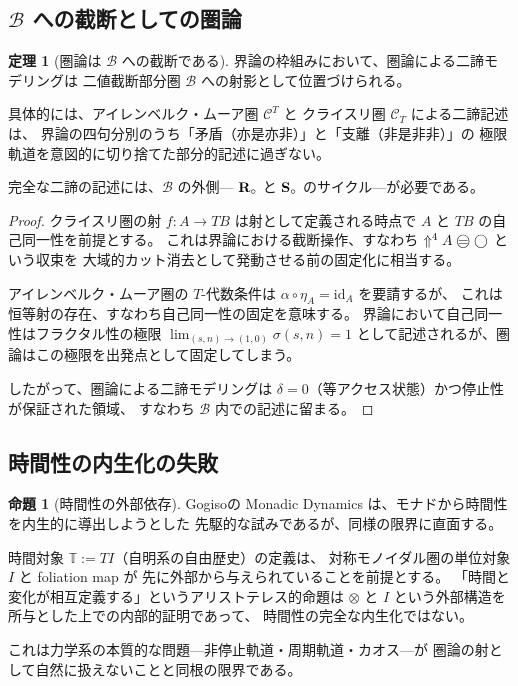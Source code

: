\documentclass[11pt,a4paper]{ltjsarticle}
\theoremstyle{definition}
\newtheorem{theorem}{定理}[section]
\newtheorem{proposition}{命題}[section]
\begin{document}
\subsection{$\mathcal{B}$ への截断としての圏論}

\begin{theorem}[圏論は $\mathcal{B}$ への截断である]
界論の枠組みにおいて、圏論による二諦モデリングは
二値截断部分圏 $\mathcal{B}$ への射影として位置づけられる。

具体的には、アイレンベルク・ムーア圏 $\mathcal{C}^T$ と
クライスリ圏 $\mathcal{C}_T$ による二諦記述は、
界論の四句分別のうち「矛盾（亦是亦非）」と「支離（非是非非）」の
極限軌道を意図的に切り捨てた部分的記述に過ぎない。

完全な二諦の記述には、$\mathcal{B}$ の外側---
$\mathbf{R}_{\circ}$ と $\mathbf{S}_{\circ}$ のサイクル---が必要である。
\end{theorem}

\begin{proof}
クライスリ圏の射 $f: A \to TB$ は射として定義される時点で
$A$ と $TB$ の自己同一性を前提とする。
これは界論における截断操作、すなわち
$\metanegation^4 A \mweq \dfix$ という収束を
大域的カット消去として発動させる前の固定化に相当する。

アイレンベルク・ムーア圏の $T$-代数条件は
$\alpha \circ \eta_A = \mathrm{id}_A$ を要請するが、
これは恒等射の存在、すなわち自己同一性の固定を意味する。
界論において自己同一性はフラクタル性の極限
$\lim_{(s,n) \to (1,0)} \sigma(s,n) = 1$
として記述されるが、圏論はこの極限を出発点として固定してしまう。

したがって、圏論による二諦モデリングは
$\delta = 0$（等アクセス状態）かつ停止性が保証された領域、
すなわち $\mathcal{B}$ 内での記述に留まる。
\end{proof}

\subsection{時間性の内生化の失敗}

\begin{proposition}[時間性の外部依存]
Gogisoの Monadic Dynamics\cite{Gogioso2015} は、モナドから時間性を内生的に導出しようとした
先駆的な試みであるが、同様の限界に直面する。

時間対象 $\mathbb{T} := TI$（自明系の自由歴史）の定義は、
対称モノイダル圏の単位対象 $I$ と foliation map が
先に外部から与えられていることを前提とする。
「時間と変化が相互定義する」というアリストテレス的命題は
$\otimes$ と $I$ という外部構造を所与とした上での内部的証明であって、
時間性の完全な内生化ではない。

これは力学系の本質的な問題---非停止軌道・周期軌道・カオス---が
圏論の射として自然に扱えないことと同根の限界である。
\end{proposition}
\end{document}
